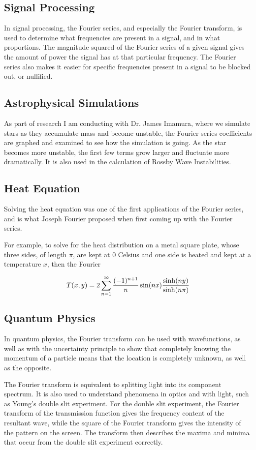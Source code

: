 \documentclass{article}
\begin{document}
\subsection{Signal Processing}
In signal processing, the Fourier series, and especially the Fourier transform, is used to determine what frequencies are present in a signal, and in what proportions. The magnitude squared of the Fourier series of a given signal gives the amount of power the signal has at that particular frequency. The Fourier series also makes it easier for specific frequencies present in a signal to be blocked out, or nullified.
\subsection{Astrophysical Simulations}
As part of research I am conducting with Dr. James Imamura, where we simulate stars as they accumulate mass and become unstable, the Fourier series coefficients are graphed and examined to see how the simulation is going. As the star becomes more unstable, the first few terms grow larger and fluctuate more dramatically.
It is also used in the calculation of Rossby Wave Instabilities.
\subsection{Heat Equation}
Solving the heat equation was one of the first applications of the Fourier series, and is what Joseph Fourier proposed when first coming up with the Fourier series.

For example, to solve for the heat distribution on a metal square plate, whose three sides, of length $\pi$, are kept at 0 Celsius and one side is heated and kept at a temperature $x$, then the Fourier 

$$T(x,y) = 2\sum_{n=1}^\infty \frac{(-1)^{n+1}}{n} \sin(nx) {\sinh(ny) \over \sinh(n\pi)}$$

\subsection{Quantum Physics}
In quantum physics, the Fourier transform can be used with wavefunctions, as well as with the uncertainty principle to show that completely knowing the momentum of a particle means that the location is completely unknown, as well as the opposite. 

The Fourier transform is equivalent to splitting light into its component spectrum. It is also used to understand phenomena in optics and with light, such as Young's double slit experiment. For the double slit experiment, the Fourier transform of the transmission function gives the frequency content of the resultant wave, while the square of the Fourier transform gives the intensity of the pattern on the screen. The transform then describes the maxima and minima that occur from the double slit experiment correctly.
\end{document}
